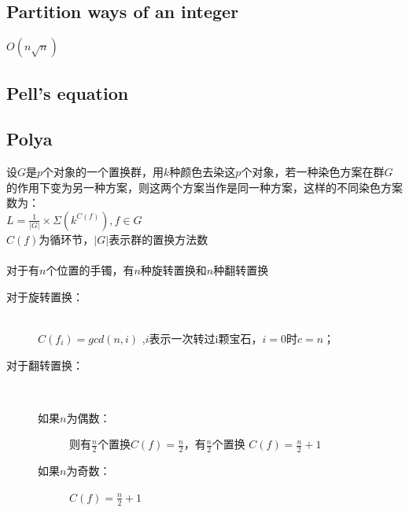 \subsection{Partition ways of an integer}
$O(n\sqrt{n})$


\subsection{Pell's equation}


\subsection{Polya}
	设$G$是$p$个对象的一个置换群，用$k$种颜色去染这$p$个对象，若一种染色方案在群$G$的作用下变为另一种方案，则这两个方案当作是同一种方案，这样的不同染色方案数为：\\
	$L=\frac{1}{\left |G  \right |}\times \Sigma(k^{C(f)}), f\in G$\\
	$C(f)$为循环节，$\left |G  \right |$表示群的置换方法数\\
	\\
	对于有$n$个位置的手镯，有$n$种旋转置换和$n$种翻转置换
	\begin{description}
		\item[对于旋转置换：] ~\\
		$C(f_i)=gcd(n,i)$ ,$i$表示一次转过i颗宝石，$i=0$时$c=n$；\\
		\item[对于翻转置换：] ~\\
		\begin{description}
			\item[如果$n$为偶数：] 则有$\frac{n}{2}$个置换$C(f)=\frac{n}{2}$，有$\frac{n}{2}$个置换 $C(f)=\frac{n}{2}+1$\\
			\item[如果$n$为奇数：] $C(f)=\frac{n}{2}+1$\\
		\end{description}
	\end{description}

